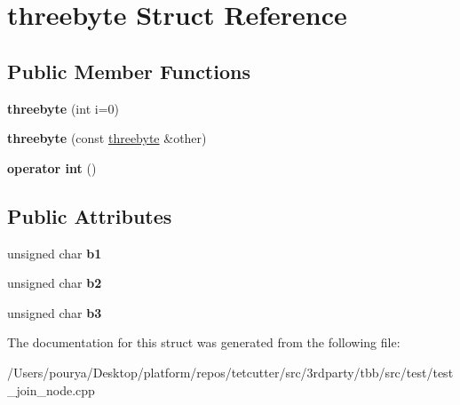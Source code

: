 \hypertarget{structthreebyte}{}\section{threebyte Struct Reference}
\label{structthreebyte}
\subsection*{Public Member Functions}
\begin{DoxyCompactItemize}
\item 
\hypertarget{structthreebyte_ad983afe8520113c9c1afc7f5a7a667f3}{}{\bfseries threebyte} (int i=0)\label{structthreebyte_ad983afe8520113c9c1afc7f5a7a667f3}

\item 
\hypertarget{structthreebyte_a734df6fc7e90b5006365f387ebec8560}{}{\bfseries threebyte} (const \hyperlink{structthreebyte}{threebyte} \&other)\label{structthreebyte_a734df6fc7e90b5006365f387ebec8560}

\item 
\hypertarget{structthreebyte_a53e3c5710f0d8f41657317c0ae02d8bc}{}{\bfseries operator int} ()\label{structthreebyte_a53e3c5710f0d8f41657317c0ae02d8bc}

\end{DoxyCompactItemize}
\subsection*{Public Attributes}
\begin{DoxyCompactItemize}
\item 
\hypertarget{structthreebyte_a7bcc8606735254261b53e67dd0757f73}{}unsigned char {\bfseries b1}\label{structthreebyte_a7bcc8606735254261b53e67dd0757f73}

\item 
\hypertarget{structthreebyte_ad37a5577ef37ae00e882cbeb2f755d23}{}unsigned char {\bfseries b2}\label{structthreebyte_ad37a5577ef37ae00e882cbeb2f755d23}

\item 
\hypertarget{structthreebyte_ab98c213db51a29cc76a87a7c7360b427}{}unsigned char {\bfseries b3}\label{structthreebyte_ab98c213db51a29cc76a87a7c7360b427}

\end{DoxyCompactItemize}


The documentation for this struct was generated from the following file\+:\begin{DoxyCompactItemize}
\item 
/\+Users/pourya/\+Desktop/platform/repos/tetcutter/src/3rdparty/tbb/src/test/test\+\_\+join\+\_\+node.\+cpp\end{DoxyCompactItemize}
